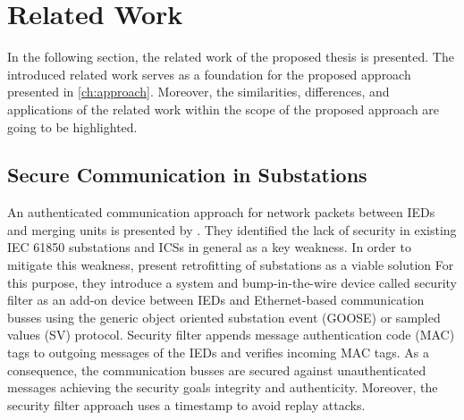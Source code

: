 \chapter{Related Work}
\label{ch:relatedwork}
In the following section, the related work of the proposed thesis is presented.
The introduced related work serves as a foundation for the proposed approach presented in \autoref{ch:approach}.
Moreover, the similarities, differences, and applications of the related work within the scope of the proposed approach are going to be highlighted.

\section{Secure Communication in Substations}
An authenticated communication approach for network packets between IEDs and merging units is presented by \citeauthor{Ishchenko2018} \cite{Ishchenko2018}.
They identified the lack of security in existing IEC 61850 substations and ICSs in general as a key weakness.
In order to mitigate this weakness, \citeauthor{Ishchenko2018} present retrofitting of substations as a viable solution
For this purpose, they introduce a system and bump-in-the-wire device called security filter as an add-on device between IEDs and Ethernet-based communication busses using the generic object oriented substation event (GOOSE) or sampled values (SV) protocol.
Security filter appends message authentication code (MAC) tags to outgoing messages of the IEDs and verifies incoming MAC tags.
As a consequence, the communication busses are secured against unauthenticated messages achieving the security goals integrity and authenticity.
Moreover, the security filter approach uses a timestamp to avoid replay attacks.

